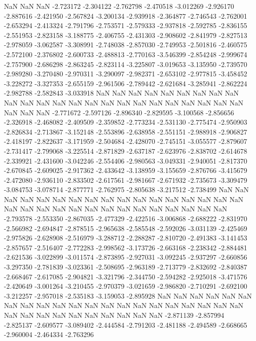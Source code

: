 NaN
NaN
NaN
-2.723172
-2.304122
-2.762798
-2.470518
-3.012269
-2.926170
-2.887616
-2.421950
-2.567824
-3.200134
-2.939918
-2.364877
-2.746543
-2.762001
-2.653294
-2.413324
-2.791796
-2.753571
-2.579333
-2.937818
-2.592785
-2.836155
-2.551953
-2.823158
-3.188775
-2.406755
-2.431303
-2.908602
-2.841979
-2.827513
-2.978059
-3.062587
-3.308991
-2.748038
-2.857030
-2.749953
-2.501816
-2.460575
-2.572100
-2.376802
-2.600733
-2.488813
-2.770163
-3.546399
-2.854248
-2.999674
-2.757900
-2.686298
-2.863245
-2.823114
-3.225807
-3.019653
-3.135950
-2.739570
-2.989280
-3.270480
-2.970311
-3.290097
-2.982371
-2.653102
-2.977815
-3.458452
-3.228272
-3.327353
-2.655159
-2.961506
-2.789442
-2.621684
-3.285941
-2.862224
-2.982788
-2.582843
-3.033918
NaN
NaN
NaN
NaN
NaN
NaN
NaN
NaN
NaN
NaN
NaN
NaN
NaN
NaN
NaN
NaN
NaN
NaN
NaN
NaN
NaN
NaN
NaN
NaN
NaN
NaN
NaN
-2.771672
-2.597126
-2.896340
-2.829595
-3.100568
-2.856656
-2.326918
-2.468082
-2.409509
-2.359852
-2.773234
-2.531130
-2.775474
-2.950903
-2.826834
-2.713867
-3.152148
-2.553896
-2.638958
-2.551151
-2.988918
-2.906827
-2.418197
-2.822637
-3.171959
-2.504684
-2.428070
-2.745151
-3.055577
-2.879607
-2.731417
-2.799068
-3.225514
-2.871829
-2.637187
-2.623976
-2.838702
-2.614678
-2.339921
-2.431600
-3.042246
-2.554406
-2.980563
-3.049331
-2.940051
-2.817370
-2.670845
-2.609025
-2.917362
-2.433642
-3.138959
-3.155659
-2.876766
-3.415679
-2.472080
-2.936110
-2.833502
-2.617561
-2.981667
-2.671932
-2.735673
-3.309479
-3.084753
-3.078714
-2.877771
-2.762975
-2.805638
-3.217512
-2.738499
NaN
NaN
NaN
NaN
NaN
NaN
NaN
NaN
NaN
NaN
NaN
NaN
NaN
NaN
NaN
NaN
NaN
NaN
NaN
NaN
NaN
NaN
NaN
NaN
NaN
NaN
NaN
NaN
NaN
NaN
NaN
-2.793578
-2.553350
-2.867035
-2.477329
-2.422516
-3.006868
-2.688222
-2.831970
-2.566982
-2.694847
-2.878515
-2.965638
-2.585548
-2.592026
-3.031139
-2.425469
-2.975826
-2.628908
-2.516979
-3.288712
-2.288287
-2.810720
-2.491383
-3.141453
-2.857657
-2.516407
-2.772283
-2.998562
-3.173726
-2.663168
-2.238342
-2.884481
-2.621536
-3.022899
-3.011574
-2.873895
-2.927031
-3.092245
-2.937297
-2.660856
-3.297350
-2.781839
-3.023361
-2.508695
-2.963189
-2.713779
-2.832692
-2.840387
-2.668467
-2.617085
-2.904821
-3.321796
-2.344750
-2.594282
-2.925018
-3.471576
-2.420649
-3.001264
-3.210455
-2.970379
-3.021659
-2.986820
-2.710291
-2.692100
-3.212257
-2.957018
-2.535183
-3.159053
-2.895928
NaN
NaN
NaN
NaN
NaN
NaN
NaN
NaN
NaN
NaN
NaN
NaN
NaN
NaN
NaN
NaN
NaN
NaN
NaN
NaN
NaN
NaN
NaN
NaN
NaN
NaN
NaN
NaN
NaN
NaN
NaN
-2.871139
-2.857994
-2.825137
-2.609577
-3.089402
-2.444584
-2.791203
-2.481188
-2.494589
-2.668665
-2.960004
-2.464334
-2.763296

